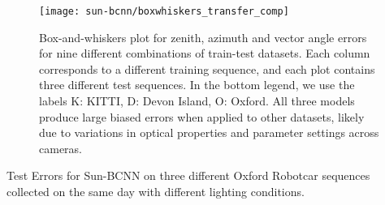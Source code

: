 \begin{figure}
    \centering
    \texttt{[image: sun-bcnn/boxwhiskers\_transfer\_comp]}
    \caption{Box-and-whiskers plot for zenith, azimuth and vector angle errors for nine different combinations of train-test datasets.  Each column corresponds to a different training sequence, and each plot contains three different test sequences. In the bottom legend, we use the labels K: KITTI, D: Devon Island, O: Oxford. All three models produce large biased errors when applied to other datasets, likely due to variations in optical properties and parameter settings across cameras.}
    \label{fig:sun-bcnn_experiment-transfer-boxwhiskers}
\end{figure}

\begin{table}[]
\centering
\caption{Test Errors for Sun-BCNN on three different Oxford Robotcar sequences collected on the same day with different lighting conditions.}
\label{tab:sun-bcnn_testBCNN_oxford_weather}


\end{table}
